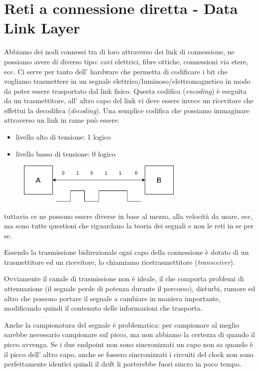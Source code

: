 \section{Reti a connessione diretta - Data Link Layer}
Abbiamo dei nodi connessi tra di loro attraverso dei link di connessione, ne possiamo avere di diverso tipo: cavi elettrici, fibre ottiche, connessioni via etere, ecc.
Ci serve per tanto dell' hardware che permetta di codificare i bit che vogliamo trasmettere in un segnale elettrico/luminoso/elettromagnetico in modo da poter essere trasportato dal link fisico.
Questa codifica (\emph{encoding}) è eseguita da un trasmettitore, all' altro capo del link vi deve essere invece un ricevitore che effettui la decodifica (\emph{decoding}).
Una semplice codifica che possiamo immaginare attraverso un link in rame può essere:
\begin{itemize}
    \item livello alto di tensione: 1 logico
    \item livello basso di tensione: 0 logico
\end{itemize}
\begin{figure}[H]
    \centering
    \includegraphics[width=300px]{images/3_Reti_connessione_diretta/encoding.png}
\end{figure}
tuttavia ce ne possono essere diverse in base al mezzo, alla velocità da usare, ecc, ma sono tutte questioni che riguardano la teoria dei segnali e non le reti in se per se.

Essendo la trasmissione bidirezionale ogni capo della connessione è dotato di un trasmettitore ed un ricevitore, lo chiamiamo ricetrasmettitore (\emph{transceiver}).

Ovviamente il canale di trasmissione non è ideale, il che comporta problemi di attenuazione (il segnale perde di potenza durante il percorso), disturbi, rumore ed altro che possono portare il segnale a cambiare in maniera importante, modificando quindi il contenuto delle informazioni che trasporta.

Anche la campionatura del segnale è problematica: per campionare al meglio sarebbe necessario campionare sul picco, ma non abbiamo la certezza di quando il picco avvenga.
Se i due endpoint non sono sincronizzati un capo non sa quando è il picco dell' altro capo, anche se fossero sincronizzati i circuiti del clock non sono perfettamente identici quindi il drift li porterebbe fuori sincro in poco tempo.

